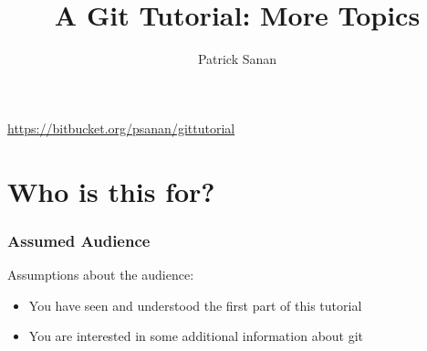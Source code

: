 \documentclass{beamer}
\author{Patrick Sanan}
\institute[ETHZ]
{
ETH Z\"{u}rich D-ERDW\\
}
\title{A Git Tutorial: More Topics}
\subtitle[]{}
\date[]{}
\begin{document}

\begin{frame}[fragile]
\titlepage
\begin{center}
\href{https://bitbucket.org/psanan/gittutorial}{https://bitbucket.org/psanan/gittutorial}
\end{center}
\end{frame}


\begin{frame}
\tableofcontents
\end{frame}

\section{Who is this for?}
\begin{frame}[fragile]
\frametitle{Assumed Audience}
Assumptions about the audience:
\begin{itemize}
\item You have seen and understood the first part of this tutorial
\item You are interested in some additional information about git
\end{itemize}
\end{frame}
\end{document}

